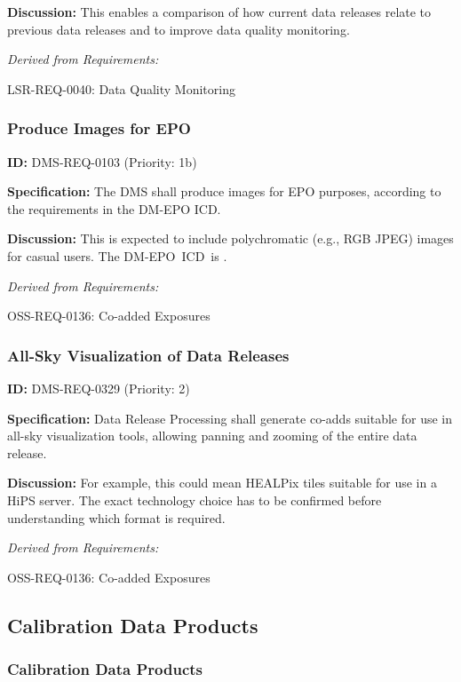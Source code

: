 \documentclass[SE,toc,lsstdraft]{lsstdoc}
\begin{document}
\textbf{Discussion: }This enables a comparison of how current data releases relate to previous data releases and to improve data quality monitoring.

\emph{Derived from Requirements:}

LSR-REQ-0040:
Data Quality Monitoring \newline

\subsubsection{Produce Images for EPO}

\label{DMS-REQ-0103}
\textbf{ID:} DMS-REQ-0103 (Priority: 1b)

\textbf{Specification:} The DMS shall produce images for EPO purposes, according to the requirements in the DM-EPO ICD.

    \textbf{Discussion: }This is expected to include polychromatic (e.g., RGB JPEG) images for casual users. The DM-EPO ICD is .

\emph{Derived from Requirements:}

OSS-REQ-0136:
Co-added Exposures \newline

\subsubsection{All-Sky Visualization of Data Releases}

\label{DMS-REQ-0329}
\textbf{ID:} DMS-REQ-0329 (Priority: 2)

\textbf{Specification:} Data Release Processing shall generate co-adds suitable for use in all-sky visualization tools, allowing panning and zooming of the entire data release.

\textbf{Discussion:} For example, this could mean HEALPix tiles suitable for use in a HiPS server. The exact technology choice has to be confirmed before understanding which format is required.

\emph{Derived from Requirements:}

OSS-REQ-0136:
Co-added Exposures \newline

\subsection{Calibration Data Products}

\subsubsection{Calibration Data Products}
\end{document}
